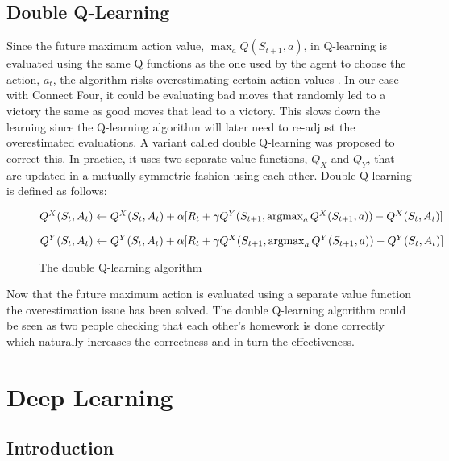 \documentclass[titlepage]{article}
\begin{document}
\subsection{Double Q-Learning}

\vskip 0.2cm

Since the future maximum action value, $\max_{a}Q(S_{t+1}, a)$, in Q-learning is evaluated using the same Q functions as the one used by the agent to choose the action, $a_{t}$, the algorithm risks overestimating certain action values \cite{doubleq}. In our case with Connect Four, it could be evaluating bad moves that randomly led to a victory the same as good moves that lead to a victory. This slows down the learning since the Q-learning algorithm will later need to re-adjust the overestimated evaluations. A variant called double Q-learning \cite{doubleq} was proposed to correct this. In practice, it uses two separate value functions, $Q_{X}$ and $Q_{Y}$, that are updated in a mutually symmetric fashion using each other. Double Q-learning is defined as follows:

\vskip 0.5cm

\begin{figure}[h]
    \centerline{$Q^X(S_{t}, A_{t}) \leftarrow Q^X(S_{t}, A_{t}) + \alpha[R_{t} + \gamma Q^Y(S_{t+1}, \operatorname*{argmax}_{a}Q^X(S_{t+1}, a)) - Q^X(S_{t}, A_{t})]$}
    \vskip 0.5cm
    \centerline{$Q^Y(S_{t}, A_{t}) \leftarrow Q^Y(S_{t}, A_{t}) + \alpha[R_{t} + \gamma Q^X(S_{t+1}, \operatorname*{argmax}_{a}Q^Y(S_{t+1}, a)) - Q^Y(S_{t}, A_{t})]$}
    \vskip 0.2cm
    \caption{The double Q-learning algorithm}
\end{figure}

\vskip 0.3cm

\noindent
Now that the future maximum action is evaluated using a separate value function the overestimation issue has been solved. The double Q-learning algorithm could be seen as two people checking that each other's homework is done correctly which naturally increases the correctness and in turn the effectiveness.

\newpage

\section{Deep Learning}

\subsection{Introduction}
\end{document}
